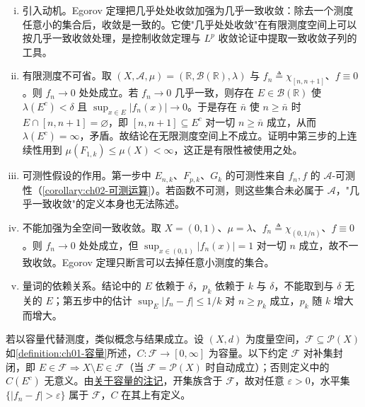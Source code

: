 \documentclass[../../main.tex]{subfiles}%
\begin{document}
\begin{remark}\label{remark:ch02-Egorov}
\begin{enumerate}[(i)]
\item 引入动机。Egorov 定理把几乎处处收敛加强为几乎一致收敛：除去一个测度任意小的集合后，收敛是一致的。它使"几乎处处收敛"在有限测度空间上可以按几乎一致收敛处理，是控制收敛定理与 $L^p$ 收敛论证中提取一致收敛子列的工具。
\item 有限测度不可省。取 $(X,\mathscr A,\mu)=(\mathbb{R},\mathscr B(\mathbb{R}),\lambda)$ 与 $f_n\triangleq\chi_{[n,n+1]}$、$f\equiv0$。则 $f_n\to0$ 处处成立。若 $f_n\to0$ 几乎一致，则存在 $E\in\mathscr B(\mathbb{R})$ 使 $\lambda(E^c)<\delta$ 且 $\sup_{x\in E}|f_n(x)|\to0$。于是存在 $\bar n$ 使 $n\geqslant\bar n$ 时 $E\cap[n,n+1]=\varnothing$，即 $[n,n+1]\subseteq E^c$ 对一切 $n\geqslant\bar n$ 成立，从而 $\lambda(E^c)=\infty$，矛盾。故结论在无限测度空间上不成立。证明中第三步的上连续性用到 $\mu(F_{1,k})\leqslant\mu(X)<\infty$，这正是有限性被使用之处。
\item 可测性假设的作用。第一步中 $E_{n,k}$、$F_{p,k}$、$G_k$ 的可测性来自 $f_n,f$ 的 $\mathscr A$-可测性（\cref{corollary:ch02-可测运算}）。若函数不可测，则这些集合未必属于 $\mathscr A$，"几乎一致收敛"的定义本身也无法陈述。
\item 不能加强为全空间一致收敛。取 $X=(0,1)$、$\mu=\lambda$、$f_n\triangleq\chi_{(0,1/n)}$、$f\equiv0$。则 $f_n\to0$ 处处成立，但 $\sup_{x\in(0,1)}|f_n(x)|=1$ 对一切 $n$ 成立，故不一致收敛。Egorov 定理只断言可以去掉任意小测度的集合。
\item 量词的依赖关系。结论中的 $E$ 依赖于 $\delta$，$p_k$ 依赖于 $k$ 与 $\delta$，不能取到与 $\delta$ 无关的 $E$；第五步中的估计 $\sup_E|f_n-f|\leqslant1/k$ 对 $n\geqslant p_k$ 成立，$p_k$ 随 $k$ 增大而增大。
\end{enumerate}
\end{remark}

若以容量代替测度，类似概念与结果成立。设 $(X,d)$ 为度量空间，$\mathscr F\subseteq\mathscr P(X)$ 如\cref{definition:ch01-容量}所述，$C:\mathscr F\to[0,\infty]$ 为容量。以下约定 $\mathscr F$ 对补集封闭，即 $E\in\mathscr F\Rightarrow X\setminus E\in\mathscr F$（当 $\mathscr F=\mathscr P(X)$ 时自动成立）；否则定义中的 $C(E^c)$ 无意义。由\hyperref[remark:ch01-容量与外测度]{关于容量的注记}，开集族含于 $\mathscr F$，故对任意 $\varepsilon>0$，水平集 $\{|f_n-f|>\varepsilon\}$ 属于 $\mathscr F$，$C$ 在其上有定义。
\end{document}

